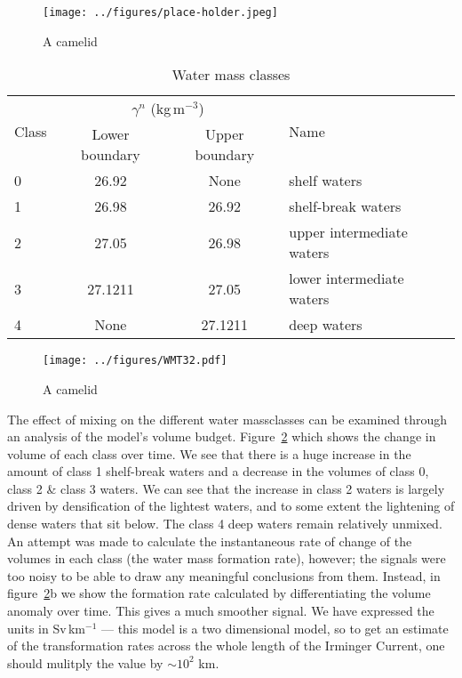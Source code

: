 \begin{figure} 
    \centering
    \texttt{[image: ../figures/place-holder.jpeg]}
    \caption{A camelid}
    \label{fig:WaterClass}
\end{figure}

\begin{table}[]
    \caption{Water mass classes}
    \label{tab:Class}
    \begin{tabular}{lccl}
        \hline
    \multirow{2}{*}{Class} & \multicolumn{2}{c}{$\gamma^n$ (kg\,m$^{-3}$)}  & \multirow{2}{*}{Name}     \\
                           & Lower boundary & Upper boundary &                           \\ \hline \hline
    0                      & 26.92          & None           & shelf waters              \\
    1                      & 26.98          & 26.92          & shelf-break waters        \\
    2                      & 27.05          & 26.98          & upper intermediate waters \\
    3                      & 27.1211        & 27.05          & lower intermediate waters \\
    4                      & None           & 27.1211        & deep waters               \\ \hline
    \end{tabular}
    \end{table}

\begin{figure} 
    \centering
    \texttt{[image: ../figures/WMT32.pdf]}
    \caption{A camelid}
    \label{fig:EnsStandardWMT}
\end{figure}

The effect of mixing on the different water massclasses can be examined through an analysis of the model's volume budget. Figure~\ref{fig:EnsStandardWMT} which shows the change in volume of each class over time. We see that there is a huge increase in the amount of class 1 shelf-break waters and a decrease in the volumes of class 0, class 2 \& class 3 waters. We can see that the increase in class 2 waters is largely driven by densification of the lightest waters, and to some extent the lightening of dense waters that sit below. The class 4 deep waters remain relatively unmixed. An attempt was made to calculate the instantaneous rate of change of the volumes in each class (the water mass formation rate), however; the signals were too noisy to be able to draw any meaningful conclusions from them\footnotemark. Instead, in figure~\ref{fig:EnsStandardWMT}b we show the formation rate calculated by differentiating the volume anomaly over time. This gives a much smoother signal. We have expressed the units in Sv\,km$^{-1}$ --- this model is a two dimensional model, so to get an estimate of the transformation rates across the whole length of the Irminger Current, one should mulitply the value by $\sim 10^2$ km.

